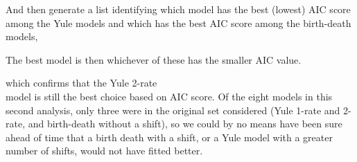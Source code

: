 \begin{Shaded}
\begin{Highlighting}[]
                     \NormalTok{* (}\NormalTok{) + } \NormalTok{* pars[}\NormalTok{] )}
                             \NormalTok{* (}\NormalTok{) + } \NormalTok{* pars[}\NormalTok{] )}
\end{Highlighting}
\end{Shaded}
And then generate a list identifying which model has the best (lowest)
AIC score among the Yule models and which has the best AIC score among
the birth-death models,

\begin{Shaded}
\begin{Highlighting}[]
\NormalTok{(} 
                          
\end{Highlighting}
\end{Shaded}
The best model is then whichever of these has the smaller AIC value.

\begin{Shaded}
\begin{Highlighting}[]
\NormalTok{(}\NormalTok{(}
\end{Highlighting}
\end{Shaded}
which confirms that the Yule 2-rate\\model is still the best choice
based on AIC score. Of the eight models in this second analysis, only
three were in the original set considered (Yule 1-rate and 2-rate, and
birth-death without a shift), so we could by no means have been sure
ahead of time that a birth death with a shift, or a Yule model with a
greater number of shifts, would not have fitted better.




